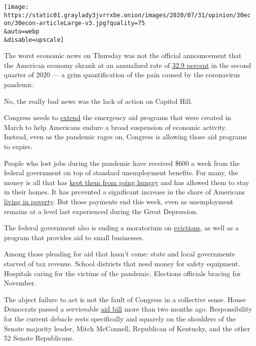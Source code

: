 \texttt{[image: https://static01.graylady3jvrrxbe.onion/images/2020/07/31/opinion/30econ/30econ-articleLarge-v3.jpg?quality=75\\\&auto=webp\\\&disable=upscale]}

The worst economic news on Thursday was not the official announcement
that the American economy shrank at an annualized rate of
\href{https://www.nytimes3xbfgragh.onion/live/2020/07/30/business/stock-market-today-coronavirus?action=click\&module=Top\%20Stories\&pgtype=Homepage}{32.9
percent} in the second quarter of 2020 --- a grim quantification of the
pain caused by the coronavirus pandemic.

No, the really bad news was the lack of action on Capitol Hill.

Congress needs to
\href{https://www.nytimes3xbfgragh.onion/2020/03/27/us/politics/coronavirus-house-voting.html}{extend}
the emergency aid programs that were created in March to help Americans
endure a broad suspension of economic activity. Instead, even as the
pandemic rages on, Congress is allowing those aid programs to expire.

People who lost jobs during the pandemic have received \$600 a week from
the federal government on top of standard unemployment benefits. For
many, the money is all that has
\href{https://www.msn.com/en-us/finance/markets/almost-30-million-in-us-didn-e2-80-99t-have-enough-to-eat-last-week/ar-BB17ldBN}{kept
them from going hungry} and has allowed them to stay in their homes. It
has prevented a significant increase in the share of Americans
\href{https://www.nytimes3xbfgragh.onion/2020/06/21/us/politics/coronavirus-poverty.html}{living
in poverty}. But those payments end this week, even as unemployment
remains at a level last experienced during the Great Depression.

The federal government also is ending a moratorium on
\href{https://www.nytimes3xbfgragh.onion/2020/07/23/opinion/coronavirus-evictions-rent.html}{evictions},
as well as a program that provides aid to small businesses.

Among those pleading for aid that hasn't come: state and local
governments starved of tax revenue. School districts that need money for
safety equipment. Hospitals caring for the victims of the pandemic.
Elections officials bracing for November.

The abject failure to act is not the fault of Congress in a collective
sense. House Democrats passed a serviceable
\href{https://www.nytimes3xbfgragh.onion/2020/05/15/us/politics/house-simulus-vote.html}{aid
bill} more than two months ago. Responsibility for the current debacle
rests specifically and squarely on the shoulders of the Senate majority
leader, Mitch McConnell, Republican of Kentucky, and the other 52 Senate
Republicans.

